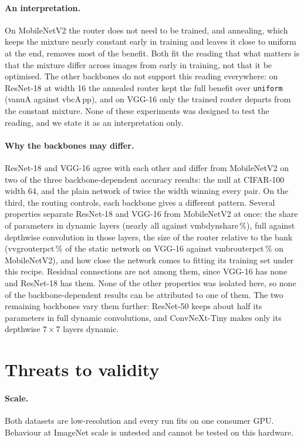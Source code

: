 \documentclass[10pt,a4paper]{article}
\newcommand{\V}[1]{\csname v#1\endcsname}
\begin{document}
\paragraph{An interpretation.} On MobileNetV2 the router does not need to
be trained, and annealing, which keeps the mixture nearly constant early in
training and leaves it close to uniform at the end, removes most of the
benefit. Both fit the reading that what matters is that the mixture differ
across images from early in training, not that it be optimised. The other
backbones do not support this reading everywhere: on ResNet-18 at width 16
the annealed router kept the full benefit over \texttt{uniform}
(\V{anuA} against \V{bcA}\,pp), and on VGG-16 only the trained router
departs from the constant mixture. None of these experiments was designed
to test the reading, and we state it as an interpretation only.

\paragraph{Why the backbones may differ.} ResNet-18 and VGG-16 agree with
each other and differ from MobileNetV2 on two of the three
backbone-dependent accuracy results: the null at CIFAR-100 width 64, and
the plain network of twice the width winning every pair. On the third, the
routing controls, each backbone gives a different pattern. Several
properties separate ResNet-18 and VGG-16 from MobileNetV2 at once: the share of parameters in dynamic layers (nearly all
against \V{mbdynshare}\,\%), full against depthwise convolution in those
layers, the size of the router relative to the bank (\V{vgrouterpct}\,\% of
the static network on VGG-16 against \V{mbrouterpct}\,\% on MobileNetV2),
and how close the network comes to fitting its training set under this
recipe. Residual connections are not among them, since VGG-16 has none and
ResNet-18 has them. None of the other properties was isolated here, so
none of the backbone-dependent results can be attributed to one of them.
The two remaining backbones vary them further: ResNet-50 keeps about half
its parameters in full dynamic convolutions, and ConvNeXt-Tiny makes only
its depthwise $7\times7$ layers dynamic.

\section{Threats to validity}\label{sec:threats}

\paragraph{Scale.} Both datasets are low-resolution and every run fits on
one consumer GPU. Behaviour at ImageNet scale is untested and cannot be
tested on this hardware.
\end{document}
